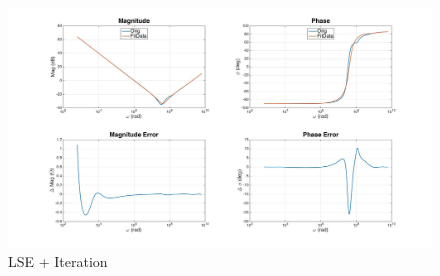 \begin{figure}[ht!]
\ifisPPT
\noindent{}
\else
\includegraphics[keepaspectratio=true,width=6in]{./figures/regression/levyIter.jpg}
\fi
\centering
\caption{LSE + Iteration}
\label{fig:levyIter}
\end{figure}

